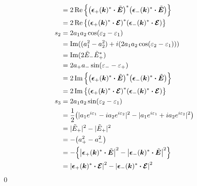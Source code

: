 \documentclass[uplatex,dvipdfmx,a4paper,11pt]{jlreq}
\makeatletter
\newcommand{\kk}{\bm{k}}
\theoremstyle{definition}
\renewenvironment{proof}[1][\proofname]{\par
  \normalfont
  \topsep6\p@\@plus6\p@ \trivlist
  \item[\hskip\labelsep{\bfseries #1}\@addpunct{\bfseries}]\ignorespaces\quad\par
}{%
  \qed\endtrivlist\@endpefalse
}
\renewcommand\proofname{証明}
\makeatother
\begin{document}
\begin{proof}
\begin{align}
        & = 2\Re\qty{\qty(\ee_+(\kk)^*\vdot\ET)^*\qty(\ee_-(\kk)^*\vdot\ET)}                                                           \\
        & = 2\Re\qty{\qty(\ee_+(\kk)^*\vdot\EC)^*\qty(\ee_-(\kk)^*\vdot\EC)}                                                           \\
    s_2 & = 2a_1a_2\cos(\varepsilon_2 - \varepsilon_1)                                                                                 \\
        & = \Im((a_1^2 - a_2^2) + i(2a_1a_2\cos(\varepsilon_2 - \varepsilon_1)))                                                       \\
        & = \Im(2\tilde{E}_-\tilde{E}_+^*)                                                                                             \\
        & = 2a_+a_-\sin(\varepsilon_- - \varepsilon_+)                                                                                 \\
        & = 2\Im\qty{\qty(\ee_+(\kk)^*\vdot\ET)^*\qty(\ee_-(\kk)^*\vdot\ET)}                                                           \\
        & = 2\Im\qty{\qty(\ee_+(\kk)^*\vdot\EC)^*\qty(\ee_-(\kk)^*\vdot\EC)}                                                           \\
    s_3 & = 2a_1a_2\sin(\varepsilon_2 - \varepsilon_1)                                                                                 \\
        & = \frac{1}{2}\qty(|a_1e^{i\varepsilon_1} - i a_2e^{i\varepsilon_2}|^2 - |a_1e^{i\varepsilon_1} + i a_2e^{i\varepsilon_2}|^2) \\
        & = |\tilde{E}_+|^2 - |\tilde{E}_+|^2                                                                                          \\
        & = -\qty(a_+^2 - a_-^2)                                                                                                       \\
        & = -\qty{\qty|\ee_+(\kk)^*\vdot\ET|^2 - \qty|\ee_-(\kk)^*\vdot\ET|^2}                                                         \\
        & = \qty|\ee_+(\kk)^*\vdot\EC|^2 - \qty|\ee_-(\kk)^*\vdot\EC|^2
  \end{align}
\end{proof}
\end{document}
